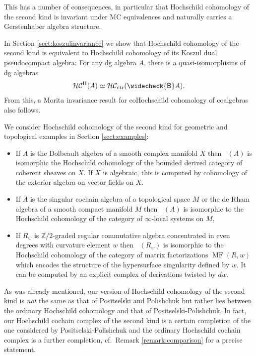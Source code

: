 \documentclass[a4paper]{amsart}
\theoremstyle{plain}
\theoremstyle{definition}
\theoremstyle{remark}
\newcommand{\Z}{\mathbb{Z}}
\DeclareMathOperator{\MF}{MF}
\DeclareMathOperator{\HHctr}{\mathcal{HC}_{\mathrm{ctr}}}
\DeclareMathOperator{\HHII}{HH^{\mathrm{II}}}
\DeclareMathOperator{\HHIIc}{\mathcal{HC}^{\mathrm{II}}}%
\newcommand{\cB}{\widecheck{\mathsf{B}}}
\numberwithin{equation}{section}
\theoremstyle{plain}
\newenvironment{customcor}[1]
{\renewcommand\theinnercustomcor{#1}\innercustomcor}
{\endinnercustomcor}
\begin{document}
	
	This has a number of consequences, in particular that Hochschild cohomology of the second kind is invariant under MC equivalences and naturally carries a Gerstenhaber algebra structure.
	
	In Section \ref{sect:koszulinvariance} we show that Hochschild cohomology of the second kind is equivalent to Hochschild cohomology of its Koszul dual pseudocompact algebra:
	\begin{customcor}{\ref{C:computeB}}\label{cor:HHII}
		For any dg algebra $A$, there is a quasi-isomorphisms of dg algebras
		\[
		\HHIIc(A) \simeq \HHctr(\cB A).
		\]
	\end{customcor}
	From this, a Morita invariance result for coHochschild cohomology of coalgebras also follows.
	
	We consider Hochschild cohomology of the second kind for geometric and topological examples in Section \ref{sect:examples}:
		\begin{itemize}
		\item If $A$ is the Dolbeault algebra of a smooth complex manifold $X$ then $\HHII(A)$ is isomorphic the Hochschild cohomology of the bounded derived category of coherent sheaves on $X$. If $X$ is algebraic, this is computed by cohomology of the exterior algebra on vector fields on $X$.
		\item If $A$ is the singular cochain algebra of a topological space $M$ or the de Rham algebra of a smooth compact manifold $M$ then $\HHII(A)$ is isomorphic to the Hochschild cohomology of the category of $\infty$-local systems on $M$,
		\item If $R_w$ is $\Z/2$-graded regular commutative algebra concentrated in even degrees with curvature element $w$ then $\HHII(R_w)$ is isomorphic to the Hochschild cohomology of the category of matrix factorizations $\MF(R,w)$ which encodes the structure of the hypersurface singularity defined by $w$. It can be computed by an explicit complex of derivations twisted by $dw$.
	\end{itemize}
	
	
	
	As was already mentioned, our version of Hochschild cohomology of the second kind is \emph{not} the same as that of Positselski and Polishchuk \cite{pp12} but rather lies between the ordinary Hochschild cohomology and that of Positselski-Polishchuk. 
	In fact, our Hochschild cochain complex of the second kind is a certain completion of the one considered by Positselski-Polishchuk and the ordinary Hochschild cochain complex is a further completion, cf.\ Remark \ref{remark:comparison} for a precise statement.
\end{document}
